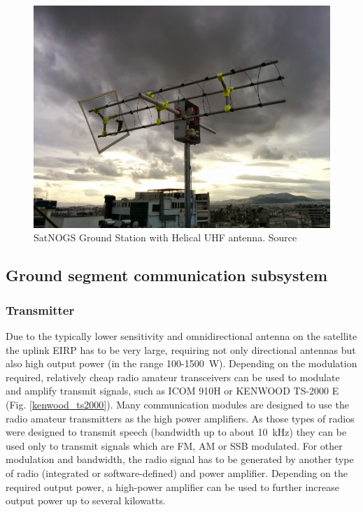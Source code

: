 \begin{figure}[H]
    \centering
    \includegraphics[width=0.45\paperwidth]{img/4/satnogs_gs.jpg}
    \caption{SatNOGS Ground Station with Helical UHF antenna. Source \cite{satnogs}}
    \label{gs:satnogs}
\end{figure}

\subsection{Ground segment communication subsystem}
\subsubsection{Transmitter}
Due to the typically lower sensitivity and omnidirectional antenna on the satellite the uplink EIRP has to be very large, requiring not only directional antennas but also high output power (in the range \si{100}-\SI{1500}{\watt}).
Depending on the modulation required, relatively cheap radio amateur transceivers can be used to modulate and amplify transmit signals, such as ICOM 910H or KENWOOD TS-2000 E (Fig. \ref{kenwood_ts2000}). Many communication modules are designed to use the radio amateur transmitters as the high power amplifiers. As those types of radios were designed to transmit speech (bandwidth up to about \SI{10}{\kHz}) they can be used only to transmit signals which are FM, AM or SSB modulated. For other modulation and bandwidth, the radio signal has to be generated by another type of radio (integrated or software-defined) and power amplifier. Depending on the required output power, a high-power amplifier can be used to further increase output power up to several kilowatts. 

